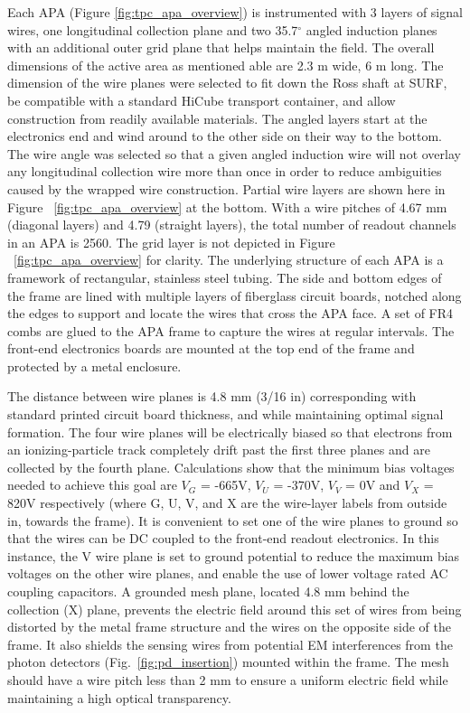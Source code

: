 Each APA (Figure \ref{fig:tpc_apa_overview}) is instrumented with 3 layers of signal wires, one longitudinal collection plane and two 35.7$^\circ$ angled induction planes with an additional outer grid plane that helps maintain the field. The overall dimensions of the active area as mentioned able are 2.3 m wide, 6 m long. The dimension of the wire planes were selected to fit down the Ross shaft at SURF, be compatible with a standard HiCube transport container, and allow construction from readily available materials.  The angled layers start at the electronics end and wind around to the other side on their way to the bottom. The wire angle was selected so that a given angled induction wire will not overlay any longitudinal collection wire more than once in order to reduce ambiguities caused by the wrapped wire construction. Partial wire layers are shown here in Figure ~\ref{fig:tpc_apa_overview} at the bottom.  With a wire pitches of 4.67 mm (diagonal layers) and 4.79 (straight layers), the total number of readout channels in an APA is 2560.
The grid layer is not depicted in Figure ~\ref{fig:tpc_apa_overview} for clarity. The underlying structure of each APA is a framework of rectangular, stainless steel tubing.  The side and bottom edges of the frame are lined with multiple layers of fiberglass circuit boards, notched along the edges to support and locate the wires that cross the APA face. A set of FR4 combs are glued to the APA frame to capture the wires at regular intervals. The front-end electronics boards are mounted at the top end of the frame and protected by a metal enclosure. 


The distance between wire planes is 4.8 mm (3/16 in) corresponding with standard printed circuit board thickness, and while maintaining optimal signal formation. The four wire planes will be electrically biased so that electrons from an ionizing-particle track completely drift past the first three planes and are collected by the fourth plane. Calculations show that the minimum bias voltages needed to achieve this goal are $V_G$ = -665V, $V_U$ = -370V, $V_V$ = 0V and $V_X$ = 820V respectively (where G, U, V, and X are the wire-layer labels from outside in, towards the frame).  It is convenient to set one of the wire planes to ground so that the wires can be DC coupled to the front-end readout electronics. In this instance, the V wire plane is set to ground potential to reduce the maximum bias voltages on the other wire planes, and enable the use of lower voltage rated AC coupling capacitors. A grounded mesh plane, located 4.8 mm behind the collection (X) plane, prevents the electric field around this set of wires from being distorted by the metal frame structure and the wires on the opposite side of the frame. It also shields the sensing wires from potential EM interferences from the photon detectors (Fig.~\ref{fig:pd_insertion}) mounted within the frame. The mesh should have a wire pitch less than 2 mm to ensure a uniform electric field while maintaining a high optical transparency.


